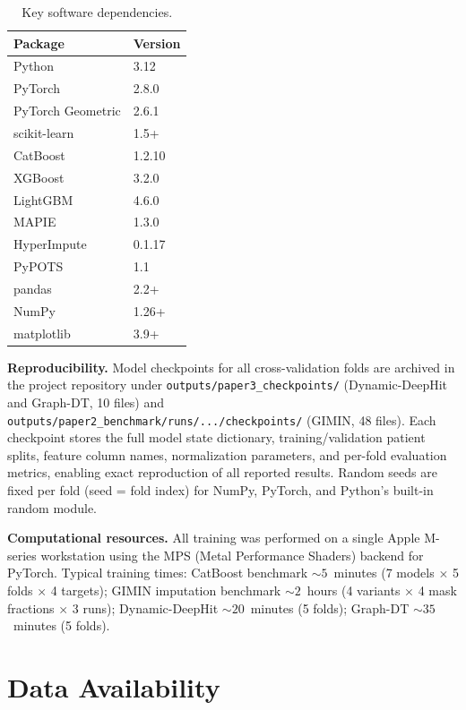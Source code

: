 \documentclass[12pt,oneside]{report}
\begin{document}
\begin{table}[h]
\centering
\caption{Key software dependencies.}
\label{tab:software}
\begin{tabular}{ll}
\toprule
\textbf{Package} & \textbf{Version} \\
\midrule
Python           & 3.12 \\
PyTorch          & 2.8.0 \\
PyTorch Geometric & 2.6.1 \\
scikit-learn     & 1.5+ \\
CatBoost         & 1.2.10 \\
XGBoost          & 3.2.0 \\
LightGBM         & 4.6.0 \\
MAPIE            & 1.3.0 \\
HyperImpute      & 0.1.17 \\
PyPOTS           & 1.1 \\
pandas           & 2.2+ \\
NumPy            & 1.26+ \\
matplotlib       & 3.9+ \\
\bottomrule
\end{tabular}
\end{table}

\noindent
\textbf{Reproducibility.}
Model checkpoints for all cross-validation folds are archived in the project
repository under \texttt{outputs/paper3\_checkpoints/} (Dynamic-DeepHit and
Graph-DT, 10 files) and
\texttt{outputs/paper2\_benchmark/runs/.../checkpoints/} (GIMIN, 48 files).
Each checkpoint stores the full model state dictionary, training/validation
patient splits, feature column names, normalization parameters, and per-fold
evaluation metrics, enabling exact reproduction of all reported results.
Random seeds are fixed per fold (seed = fold index) for NumPy, PyTorch, and
Python's built-in random module.

\noindent
\textbf{Computational resources.}
All training was performed on a single Apple M-series workstation using the
MPS (Metal Performance Shaders) backend for PyTorch. Typical training times:
CatBoost benchmark ${\sim}5$~minutes (7 models $\times$ 5 folds $\times$
4 targets); GIMIN imputation benchmark ${\sim}2$~hours (4 variants $\times$
4 mask fractions $\times$ 3 runs); Dynamic-DeepHit ${\sim}20$~minutes
(5 folds); Graph-DT ${\sim}35$~minutes (5 folds).

\chapter{Data Availability}
\label{app:data-avail}
\end{document}

